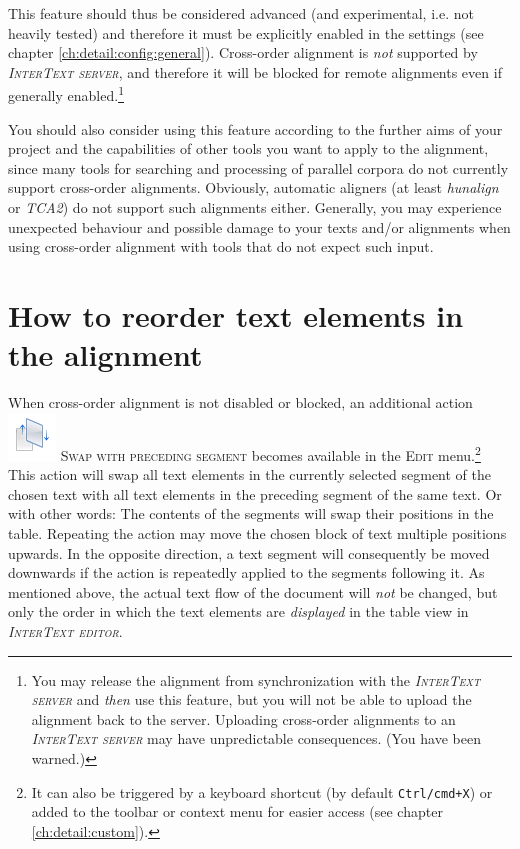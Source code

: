 \documentclass[a4paper,10pt,oneside]{book}
\newcommand{\ITeditor}{\textit{\textsc{InterText editor}}\xspace}
\newcommand{\ITserver}{\textit{\textsc{InterText server}}\xspace}
\newcommand{\keys}[1]{\texttt{#1}}
\newcommand{\menu}[1]{\textsc{#1}}
\begin{document}
This feature should thus be considered advanced (and experimental, i.e. not heavily tested) and therefore it must be explicitly enabled in the settings (see chapter \ref{ch:detail:config:general}). Cross-order alignment is \emph{not} supported by \ITserver, and therefore it will be blocked for remote alignments even if generally enabled.\footnote{You may release the alignment from synchronization with the \ITserver and \emph{then} use this feature, but you will not be able to upload the alignment back to the server. Uploading cross-order alignments to an \ITserver may have unpredictable consequences. (You have been warned.)}

You should also consider using this feature according to the further aims of your project and the capabilities of other tools you want to apply to the alignment, since many tools for searching and processing of parallel corpora do not currently support cross-order alignments. Obviously, automatic aligners (at least \emph{hunalign} or \emph{TCA2}) do not support such alignments either. Generally, you may experience unexpected behaviour and possible damage to your texts and/or alignments when using cross-order alignment with tools that do not expect such input.

\section{How to reorder text elements in the alignment}\label{ch:detail:crossorder:swap}

When cross-order alignment is not disabled or blocked, an additional action \includegraphics[height=2ex]{../images/48/swap.png} \menu{Swap with preceding segment} becomes available in the \menu{Edit} menu.\footnote{It can also be triggered by a keyboard shortcut (by default \keys{Ctrl/cmd+X}) or added to the toolbar or context menu for easier access (see chapter \ref{ch:detail:custom}).} This action will swap all text elements in the currently selected segment of the chosen text with all text elements in the preceding segment of the same text. Or with other words: The contents of the segments will swap their positions in the table. Repeating the action may move the chosen block of text multiple positions upwards. In the opposite direction, a text segment will consequently be moved downwards if the action is repeatedly applied to the segments following it. As mentioned above, the actual text flow of the document will \emph{not} be changed, but only the order in which the text elements are \emph{displayed} in the table view in \ITeditor.
\end{document}
